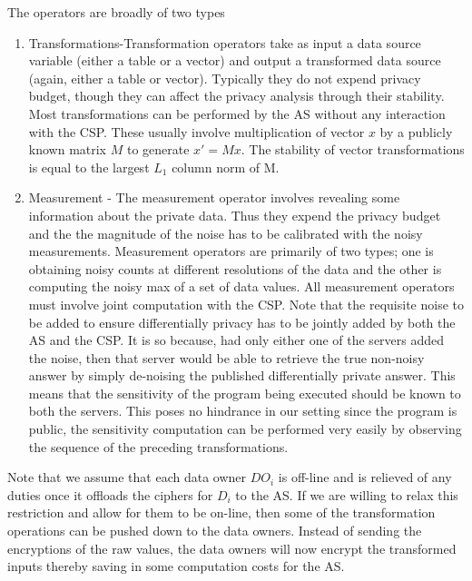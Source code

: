 The operators are broadly of two types \begin{enumerate}\item Transformations-Transformation operators take
as input a data source variable (either a table or a vector) and output
a transformed data source (again, either a table or vector). Typically they do not expend privacy budget, though
they can affect the privacy analysis through their stability. Most transformations can be performed by the AS without any interaction with the CSP. These usually involve multiplication of vector $x$ by a publicly known matrix $M$ to generate $x'=Mx$. 
The stability of vector transformations
is equal to the largest $L_1$ column norm of M.  \item Measurement - The measurement operator involves  revealing some information about the private data. Thus they expend the privacy budget and the the magnitude
of the noise has to be calibrated with the noisy measurements. Measurement operators are primarily of two types; one is obtaining noisy counts at different resolutions of the data and the other is computing the noisy max of a set of data values. All measurement operators must involve joint computation with the CSP. Note that the requisite noise to be added to ensure differentially privacy has to be jointly added by both the AS and the CSP. It is so because, had only either one of the servers added the noise, then that server would be able to retrieve the true non-noisy answer by simply de-noising the published differentially private answer. This means that the sensitivity of the program being executed should be known to both the servers. This poses no hindrance in our setting  since the program is public, the  sensitivity computation can be performed very easily by observing the sequence of the preceding transformations. \end{enumerate}
Note that we assume that each data owner $DO_i$ is off-line and is relieved of any duties once it offloads the ciphers for $D_i$  to the AS. If we are willing to relax this restriction and allow for them to be on-line, then some of the transformation operations can be pushed down to the data owners. Instead of sending the encryptions of the raw values, the data owners will now encrypt the transformed inputs thereby saving in some computation costs for the AS.